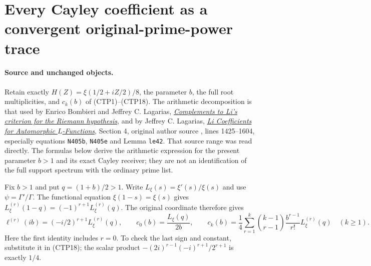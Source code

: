 \section{Every Cayley coefficient as a convergent original-prime-power trace}
\label{sec:cayley-prime-power-formula}

\paragraph{Source and unchanged objects.}
Retain exactly $H(Z)=\xi(1/2+iZ/2)/8$, the parameter $b$,
the full root multiplicities, and $c_k(b)$ of (CTP1)--(CTP18).
The arithmetic decomposition is that used by Enrico Bombieri
and Jeffrey C. Lagarias,
\href{https://doi.org/10.1006/jnth.1999.2392}{\emph{Complements to
Li's criterion for the Riemann hypothesis}}, and by Jeffrey C.
Lagarias, \href{https://arxiv.org/abs/math/0404394v4}{\emph{Li
Coefficients for Automorphic $L$-Functions}}, Section 4, original
author source , lines 1425--1604,
especially equations \texttt{N405b}, \texttt{N405e} and Lemma
\texttt{le42}. That source range was read directly. The formulas
below derive the arithmetic expression for the present parameter
$b>1$ and its exact Cayley receiver; they are not an identification
of the full support spectrum with the ordinary prime list.

Fix $b>1$ and put $q=(1+b)/2>1$. Write
$L_\xi(s)=\xi'(s)/\xi(s)$ and use $\psi=\Gamma'/\Gamma$.
The functional equation $\xi(1-s)=\xi(s)$ gives
$L_\xi^{(r)}(1-q)=(-1)^{r+1}L_\xi^{(r)}(q)$. The original
coordinate therefore gives
\begin{equation}\tag{CPP1}
 \ell^{(r)}(ib)=(-i/2)^{r+1}L_\xi^{(r)}(q),\qquad
 c_0(b)=\frac{L_\xi(q)}{2b},\qquad
 c_k(b)=\frac14\sum_{r=1}^k\binom{k-1}{r-1}
                   \frac{b^{r-1}}{r!}L_\xi^{(r)}(q)
 \quad(k\ge1).
\end{equation}
Here the first identity includes $r=0$. To check the last sign
and constant, substitute it in (CTP18); the scalar product
$-(2i)^{r-1}(-i)^{r+1}/2^{r+1}$ is exactly $1/4$.

